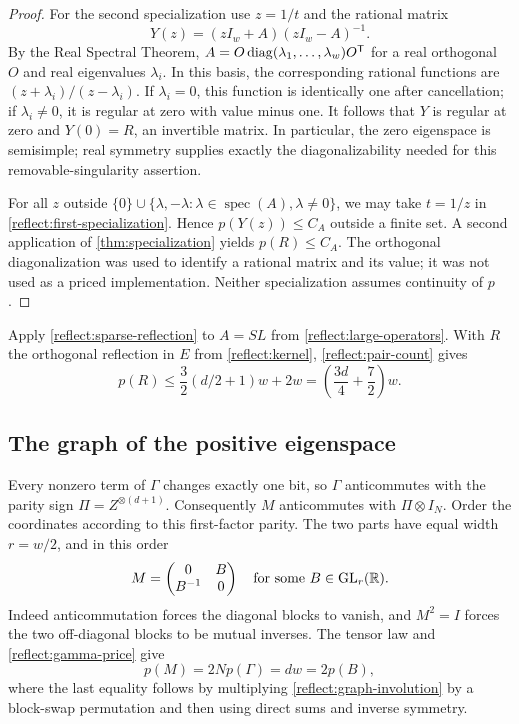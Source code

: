 \begin{proof}
For the second specialization use $z=1/t$ and the rational matrix
\[
 Y(z)=(zI_w+A)(zI_w-A)^{-1}.
\]
By the Real Spectral Theorem, $A=O\operatorname{diag}(\lambda_1,\ldots,\lambda_w)
O^{\mathsf T}$ for a real orthogonal $O$ and real eigenvalues
$\lambda_i$.  In this basis, the corresponding rational functions
are $(z+\lambda_i)/(z-\lambda_i)$.
If $\lambda_i=0$, this function is identically one after cancellation;
if $\lambda_i\ne0$, it is regular at zero with value minus one.
It follows that $Y$ is regular at zero and $Y(0)=R$, an invertible
matrix.  In particular, the zero eigenspace is semisimple; real
symmetry supplies exactly the diagonalizability needed for this
removable-singularity assertion.

For all $z$ outside
$\{0\}\cup\{\lambda,-\lambda:\lambda\in\operatorname{spec}(A),
\lambda\ne0\}$, we may take $t=1/z$ in
\eqref{reflect:first-specialization}.  Hence $p(Y(z))\leq C_A$
outside a finite set.  A second application of
\cref{thm:specialization} yields $p(R)\leq C_A$.
The orthogonal diagonalization was used to identify a rational
matrix and its value; it was not used as a priced implementation.
Neither specialization assumes continuity of $p$.
\end{proof}

Apply \cref{reflect:sparse-reflection} to $A=SL$ from
\eqref{reflect:large-operators}.  With $R$ the orthogonal reflection
in $E$ from \eqref{reflect:kernel}, \eqref{reflect:pair-count} gives
\begin{equation}
 p(R)\leq \frac32(d/2+1)w+2w
        =\left(\frac{3d}{4}+\frac72\right)w.
 \label{reflect:upper-bound}
\end{equation}

\subsection{The graph of the positive eigenspace}

Every nonzero term of $\Gamma$ changes exactly one bit, so $\Gamma$
anticommutes with the parity sign $\Pi=Z^{\otimes(d+1)}$.
Consequently $M$ anticommutes with $\Pi\otimes I_N$.
Order the coordinates according to this first-factor parity.
The two parts have equal width $r=w/2$, and in this order
\begin{equation}
 M=\begin{pmatrix}0&B\\B^{-1}&0\end{pmatrix}
 \quad\hbox{for some }B\in\operatorname{GL}_r(\mathbb R).
 \label{reflect:graph-involution}
\end{equation}
Indeed anticommutation forces the diagonal blocks to vanish, and
$M^2=I$ forces the two off-diagonal blocks to be mutual inverses.
The tensor law and \eqref{reflect:gamma-price} give
\begin{equation}
 p(M)=2N p(\Gamma)=dw=2p(B),
 \label{reflect:m-price}
\end{equation}
where the last equality follows by multiplying
\eqref{reflect:graph-involution} by a block-swap permutation and
then using direct sums and inverse symmetry.

